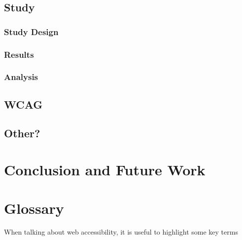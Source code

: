 \documentclass[ %
                    author={Aleena Baig},
                supervisor={Dr Simon Lock},
                    degree={BSc},
                     title={On Making Web Accessible Graphs},
                  subtitle={},
                      year={2019} ]{dissertation}
\begin{document}
\section{Study}

\subsection{Study Design}

\subsection{Results}

\subsection{Analysis}

\section{WCAG}


\section{Other?}


\chapter{Conclusion and Future Work}


\chapter{Glossary}


When talking about web accessibility, it is useful to highlight some key terms

\BlankLine
%
\glsaddall
\printglossary[nonumberlist]

\printbibliography
\end{document}
